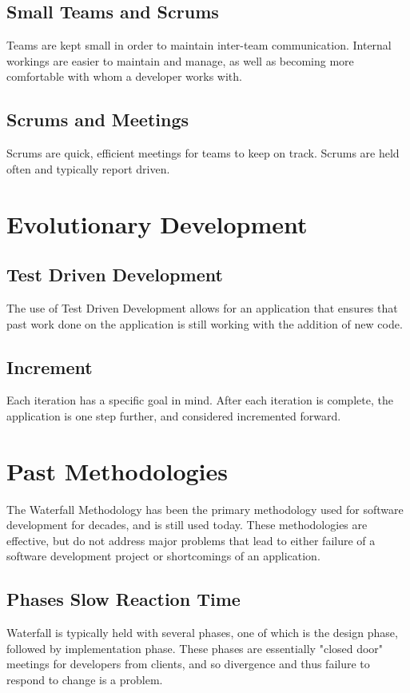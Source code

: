 \documentclass[11pt]{article}
\begin{document}
\subsection{Small Teams and Scrums}
Teams are kept small in order to maintain inter-team communication. Internal workings are easier to maintain and manage,
as well as becoming more comfortable with whom a developer works with.

\subsection{Scrums and Meetings}
Scrums are quick, efficient meetings for
teams to keep on track. Scrums are held often and typically report driven.

\section{Evolutionary Development}

\subsection{Test Driven Development}
The use of Test Driven Development allows for an application that ensures that past work done on the application
is still working with the addition of new code.

\subsection{Increment} 
Each iteration has a specific goal in mind. After each iteration is complete, the application is one
step further, and considered incremented forward.

\section{Past Methodologies}
The Waterfall Methodology has been the primary methodology used for software development for decades, and is still used today.
These methodologies are effective, but do not address major problems that lead to either failure of a software development
project or shortcomings of an application.

\subsection{Phases Slow Reaction Time}
Waterfall is typically held with several phases, one of which is the design phase, followed by implementation
phase. These phases are essentially "closed door" meetings for developers from clients, and so divergence and thus
failure to respond to change is a problem.
\end{document}
